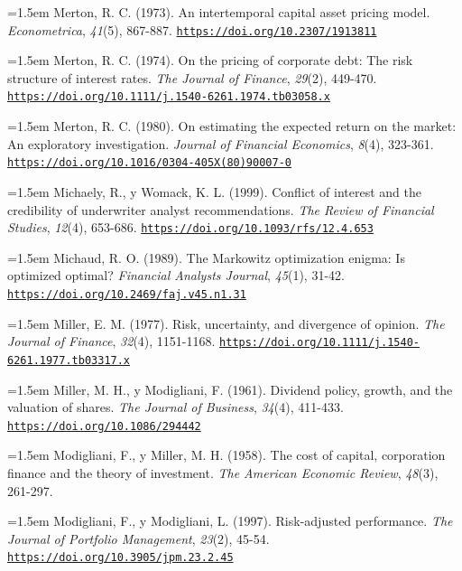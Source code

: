 \documentclass[10pt,a4paper]{article}
\begin{document}
\noindent\hangindent=1.5em Merton, R. C. (1973). An intertemporal capital asset pricing model. \textit{Econometrica}, \textit{41}(5), 867-887. \href{https://doi.org/10.2307/1913811}{\nolinkurl{https://doi.org/10.2307/1913811}}

\noindent\hangindent=1.5em Merton, R. C. (1974). On the pricing of corporate debt: The risk structure of interest rates. \textit{The Journal of Finance}, \textit{29}(2), 449-470. \href{https://doi.org/10.1111/j.1540-6261.1974.tb03058.x}{\nolinkurl{https://doi.org/10.1111/j.1540-6261.1974.tb03058.x}}

\noindent\hangindent=1.5em Merton, R. C. (1980). On estimating the expected return on the market: An exploratory investigation. \textit{Journal of Financial Economics}, \textit{8}(4), 323-361. \href{https://doi.org/10.1016/0304-405X(80)90007-0}{\nolinkurl{https://doi.org/10.1016/0304-405X(80)90007-0}}

\noindent\hangindent=1.5em Michaely, R., y Womack, K. L. (1999). Conflict of interest and the credibility of underwriter analyst recommendations. \textit{The Review of Financial Studies}, \textit{12}(4), 653-686. \href{https://doi.org/10.1093/rfs/12.4.653}{\nolinkurl{https://doi.org/10.1093/rfs/12.4.653}}

\noindent\hangindent=1.5em Michaud, R. O. (1989). The Markowitz optimization enigma: Is optimized optimal? \textit{Financial Analysts Journal}, \textit{45}(1), 31-42. \href{https://doi.org/10.2469/faj.v45.n1.31}{\nolinkurl{https://doi.org/10.2469/faj.v45.n1.31}}

\noindent\hangindent=1.5em Miller, E. M. (1977). Risk, uncertainty, and divergence of opinion. \textit{The Journal of Finance}, \textit{32}(4), 1151-1168. \href{https://doi.org/10.1111/j.1540-6261.1977.tb03317.x}{\nolinkurl{https://doi.org/10.1111/j.1540-6261.1977.tb03317.x}}

\noindent\hangindent=1.5em Miller, M. H., y Modigliani, F. (1961). Dividend policy, growth, and the valuation of shares. \textit{The Journal of Business}, \textit{34}(4), 411-433. \href{https://doi.org/10.1086/294442}{\nolinkurl{https://doi.org/10.1086/294442}}

\noindent\hangindent=1.5em Modigliani, F., y Miller, M. H. (1958). The cost of capital, corporation finance and the theory of investment. \textit{The American Economic Review}, \textit{48}(3), 261-297.

\noindent\hangindent=1.5em Modigliani, F., y Modigliani, L. (1997). Risk-adjusted performance. \textit{The Journal of Portfolio Management}, \textit{23}(2), 45-54. \href{https://doi.org/10.3905/jpm.23.2.45}{\nolinkurl{https://doi.org/10.3905/jpm.23.2.45}}
\end{document}
